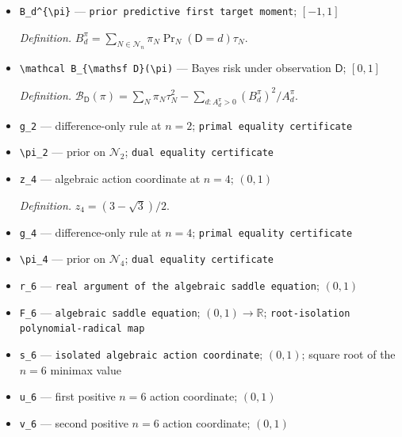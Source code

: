 \documentclass{article}
\begin{document}
\begin{itemize}
  \par\smallskip\noindent\emph{Definition.} \(A_d^{\pi}=\sum_{N\in\mathcal N_n}\pi_N\Pr_N(\mathsf D=d)\).
  \item \texttt{B\_\allowbreak{}d\textasciicircum{}\{\textbackslash{}\allowbreak{}pi\}\allowbreak{}} --- \texttt{prior predictive first target moment}; \([-1,1]\)
  \par\smallskip\noindent\emph{Definition.} \(B_d^{\pi}=\sum_{N\in\mathcal N_n}\pi_N\Pr_N(\mathsf D=d)\tau_N\).
  \item \texttt{\textbackslash{}\allowbreak{}mathcal B\_\allowbreak{}\{\textbackslash{}\allowbreak{}mathsf D\}\allowbreak{}(\textbackslash{}\allowbreak{}pi)} --- Bayes risk under observation \(\mathsf D\); \([0,1]\)
  \par\smallskip\noindent\emph{Definition.} \(\mathcal B_{\mathsf D}(\pi)=\sum_N\pi_N\tau_N^2-\sum_{d:A_d^{\pi}>0}(B_d^{\pi})^2/A_d^{\pi}\).
  \item \texttt{g\_\allowbreak{}2} --- difference-only rule at \(n=2\); \texttt{primal equality certificate}
  \item \texttt{\textbackslash{}\allowbreak{}pi\_\allowbreak{}2} --- prior on \(\mathcal N_2\); \texttt{dual equality certificate}
  \item \texttt{z\_\allowbreak{}4} --- algebraic action coordinate at \(n=4\); \((0,1)\)
  \par\smallskip\noindent\emph{Definition.} \(z_4=(3-\sqrt3)/2\).
  \item \texttt{g\_\allowbreak{}4} --- difference-only rule at \(n=4\); \texttt{primal equality certificate}
  \item \texttt{\textbackslash{}\allowbreak{}pi\_\allowbreak{}4} --- prior on \(\mathcal N_4\); \texttt{dual equality certificate}
  \item \texttt{r\_\allowbreak{}6} --- \texttt{real argument of the algebraic saddle equation}; \((0,1)\)
  \item \texttt{F\_\allowbreak{}6} --- \texttt{algebraic saddle equation}; \((0,1)\to\mathbb R\); \texttt{root-\allowbreak{}isolation polynomial-\allowbreak{}radical map}
  \item \texttt{s\_\allowbreak{}6} --- \texttt{isolated algebraic action coordinate}; \((0,1)\); square root of the \(n=6\) minimax value
  \item \texttt{u\_\allowbreak{}6} --- first positive \(n=6\) action coordinate; \((0,1)\)
  \item \texttt{v\_\allowbreak{}6} --- second positive \(n=6\) action coordinate; \((0,1)\)

\end{itemize}
\end{document}
